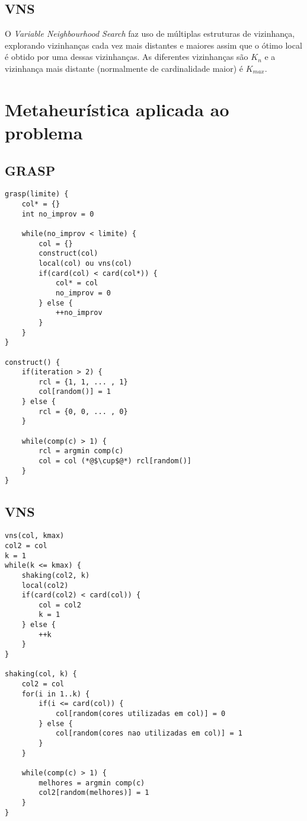 \documentclass[12pt, a4paper]{article}
\begin{document}
\subsection{VNS}
O \emph{Variable Neighbourhood Search} faz uso de múltiplas estruturas de
vizinhança, explorando vizinhanças cada vez mais distantes e maiores assim que
o ótimo local é obtido por uma dessas vizinhanças. As diferentes vizinhanças
são $ K_n $ e a vizinhança mais distante (normalmente de cardinalidade maior)
é $ K_{max} $.

\section{Metaheurística aplicada ao problema}
\subsection{GRASP}
\begin{lstlisting}[caption=Pseudocódigo para GRASP, basicstyle=\ttfamily\scriptsize]
grasp(limite) {
    col* = {}
    int no_improv = 0

    while(no_improv < limite) {
        col = {}
        construct(col)
        local(col) ou vns(col)
        if(card(col) < card(col*)) {
            col* = col
            no_improv = 0
        } else {
            ++no_improv
        }
    }
}

construct() {
    if(iteration > 2) {
        rcl = {1, 1, ... , 1}
        col[random()] = 1
    } else {
        rcl = {0, 0, ... , 0}
    }

    while(comp(c) > 1) {
        rcl = argmin comp(c)
        col = col (*@$\cup$@*) rcl[random()]
    }
}
\end{lstlisting}

\subsection{VNS}
\begin{lstlisting}[caption=Pseudocódigo para GRASP, basicstyle=\ttfamily\scriptsize]
vns(col, kmax)
col2 = col
k = 1
while(k <= kmax) {
    shaking(col2, k)
    local(col2)
    if(card(col2) < card(col)) {
        col = col2
        k = 1
    } else {
        ++k
    }
}

shaking(col, k) {
    col2 = col
    for(i in 1..k) {
        if(i <= card(col)) {
            col[random(cores utilizadas em col)] = 0
        } else {
            col[random(cores nao utilizadas em col)] = 1
        }
    }

    while(comp(c) > 1) {
        melhores = argmin comp(c)
        col2[random(melhores)] = 1
    }
}
\end{lstlisting}
\end{document}
